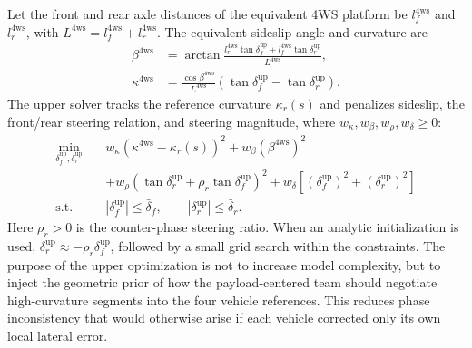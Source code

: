 \documentclass[twocolumn,3p,times,procedia]{elsarticle}
\begin{document}
Let the front and rear axle distances of the equivalent 4WS platform be $l_f^{\mathrm{4ws}}$ and $l_r^{\mathrm{4ws}}$, with $L^{\mathrm{4ws}}=l_f^{\mathrm{4ws}}+l_r^{\mathrm{4ws}}$. The equivalent sideslip angle and curvature are
\begin{equation}
\begin{aligned}
\beta^{\mathrm{4ws}} &=
\arctan\frac{l_r^{\mathrm{4ws}}\tan\delta_f^{\mathrm{up}}+l_f^{\mathrm{4ws}}\tan\delta_r^{\mathrm{up}}}{L^{\mathrm{4ws}}},\\
\kappa^{\mathrm{4ws}} &=
\frac{\cos\beta^{\mathrm{4ws}}}{L^{\mathrm{4ws}}}
\left(\tan\delta_f^{\mathrm{up}}-\tan\delta_r^{\mathrm{up}}\right).
\end{aligned}
\label{eq:fourws_beta_curvature}
\end{equation}
The upper solver tracks the reference curvature $\kappa_r(s)$ and penalizes sideslip, the front/rear steering relation, and steering magnitude, where $w_\kappa,w_\beta,w_\rho,w_\delta\ge0$:
\begin{equation}
\begin{aligned}
\min_{\delta_f^{\mathrm{up}},\delta_r^{\mathrm{up}}}\quad
&w_\kappa\left(\kappa^{\mathrm{4ws}}-\kappa_r(s)\right)^2
+w_\beta\left(\beta^{\mathrm{4ws}}\right)^2\\
&+w_\rho\left(\tan\delta_r^{\mathrm{up}}+\rho_r\tan\delta_f^{\mathrm{up}}\right)^2
+w_\delta\left[\left(\delta_f^{\mathrm{up}}\right)^2+\left(\delta_r^{\mathrm{up}}\right)^2\right]\\
\mathrm{s.t.}\quad
&|\delta_f^{\mathrm{up}}|\le \bar\delta_f,\qquad
|\delta_r^{\mathrm{up}}|\le \bar\delta_r .
\end{aligned}
\label{eq:fourws_upper_opt}
\end{equation}
Here $\rho_r>0$ is the counter-phase steering ratio. When an analytic initialization is used, $\delta_r^{\mathrm{up}}\approx-\rho_r\delta_f^{\mathrm{up}}$, followed by a small grid search within the constraints. The purpose of the upper optimization is not to increase model complexity, but to inject the geometric prior of how the payload-centered team should negotiate high-curvature segments into the four vehicle references. This reduces phase inconsistency that would otherwise arise if each vehicle corrected only its own local lateral error.
\end{document}
